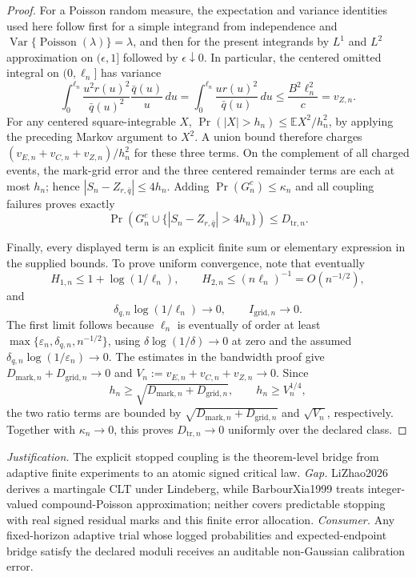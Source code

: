 \documentclass{article}
\begin{document}
\begin{proof}
For a Poisson random measure, the expectation and variance identities used here follow first for a simple integrand from independence and
\(\operatorname{Var}\{\operatorname{Poisson}(\lambda)\}=\lambda\), and then for the present integrands by \(L^1\) and \(L^2\) approximation on \((\epsilon,1]\) followed by \(\epsilon\downarrow0\).  In particular, the centered omitted integral on \((0,\ell_n]\) has variance
\[
 \int_0^{\ell_n}\frac{u^2r(u)^2}{\bar q(u)^2}
                 \frac{\bar q(u)}u\,du
 =\int_0^{\ell_n}\frac{u r(u)^2}{\bar q(u)}\,du
 \leq \frac{B^2\ell_n^2}{c}=v_{Z,n}.
\]
For any centered square-integrable \(X\),
\(\Pr(|X|>h_n)\leq\mathbb EX^2/h_n^2\), by applying the preceding Markov argument to \(X^2\).  A union bound therefore charges
\((v_{E,n}+v_{C,n}+v_{Z,n})/h_n^2\) for these three terms.  On the complement of all charged events, the mark-grid error and the three centered remainder terms are each at most \(h_n\); hence
\(|S_n-Z_{r,\bar q}|\leq4h_n\).  Adding \(\Pr(G_n^c)\leq\kappa_n\) and all coupling failures proves exactly
\[
 \Pr\!\left(G_n^c\cup\{|S_n-Z_{r,\bar q}|>4h_n\}\right)
 \leq D_{\mathrm{tr},n}.
\]

Finally, every displayed term is an explicit finite sum or elementary expression in the supplied bounds.  To prove uniform convergence, note that eventually
\[
 H_{1,n}\leq1+\log(1/\ell_n),\qquad
 H_{2,n}\leq(n\ell_n)^{-1}=O(n^{-1/2}),
\]
and
\[
 \delta_{q,n}\log(1/\ell_n)\to0,\qquad
 I_{\mathrm{grid},n}\to0.
\]
The first limit follows because \(\ell_n\) is eventually of order at least
\(\max\{\varepsilon_n,\delta_{q,n},n^{-1/2}\}\), using
\(\delta\log(1/\delta)\to0\) at zero and the assumed
\(\delta_{q,n}\log(1/\varepsilon_n)\to0\).
The estimates in the bandwidth proof give
\(D_{\mathrm{mark},n}+D_{\mathrm{grid},n}\to0\) and
\(V_n:=v_{E,n}+v_{C,n}+v_{Z,n}\to0\).  Since
\[
 h_n\geq\sqrt{D_{\mathrm{mark},n}+D_{\mathrm{grid},n}},
 \qquad h_n\geq V_n^{1/4},
\]
the two ratio terms are bounded by
\(\sqrt{D_{\mathrm{mark},n}+D_{\mathrm{grid},n}}\) and
\(\sqrt{V_n}\), respectively.  Together with \(\kappa_n\to0\), this proves
\(D_{\mathrm{tr},n}\to0\) uniformly over the declared class.
\end{proof}
\par\smallskip\noindent \textit{Justification.} The explicit stopped coupling is the theorem-level bridge from adaptive finite experiments to an atomic signed critical law. \textit{Gap.} LiZhao2026 derives a martingale CLT under Lindeberg, while BarbourXia1999 treats integer-valued compound-Poisson approximation; neither covers predictable stopping with real signed residual marks and this finite error allocation. \textit{Consumer.} Any fixed-horizon adaptive trial whose logged probabilities and expected-endpoint bridge satisfy the declared moduli receives an auditable non-Gaussian calibration error.
\end{document}
